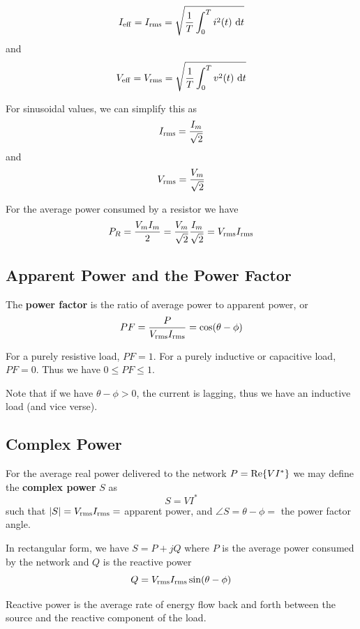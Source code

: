 \documentclass[12pt]{article}
\begin{document}
\[ I_{{\rm eff}} = I_{{\rm rms}} = \sqrt{\frac{1}{T}\int_0^T i^2(t) \ {\rm d} t} \] and \[ V_{{\rm eff}} = V_{{\rm rms}} = \sqrt{\frac{1}{T}\int_0^T v^2(t) \ {\rm d} t} \]

For sinusoidal values, we can simplify this as \[ I_{{\rm rms}} = \frac{I_m}{\sqrt{2}} \] and \[ V_{{\rm rms}} = \frac{V_m}{\sqrt{2}} \]

For the average power consumed by a resistor we have \[ P_R = \frac{V_mI_m}{2} = \frac{V_m}{\sqrt{2}}\frac{I_m}{\sqrt{2}} = V_{{\rm rms}}I_{{\rm rms}} \]

\subsection*{Apparent Power and the Power Factor}
The {\bf power factor} is the ratio of average power to apparent power, or \[ PF = \frac{P}{V_{{\rm rms}}I_{{\rm rms}}} = \cos(\theta - \phi) \]

For a purely resistive load, $PF = 1$. For a purely inductive or capacitive load, $PF = 0$. Thus we have $0 \leq PF \leq 1$.

Note that if we have $\theta - \phi > 0$, the current is lagging, thus we have an inductive load (and vice verse).

\subsection*{Complex Power}
For the average real power delivered to the network $P = {\rm Re}\{VI^*\}$ we may define the {\bf complex power} $S$ as \[ S = VI^* \] such that $|S| = V_{{\rm rms}}I_{{\rm rms}} =$ apparent power, and $\angle S = \theta - \phi =$ the power factor angle.

In rectangular form, we have $S = P + jQ$ where $P$ is the average power consumed by the network and $Q$ is the reactive power \[ Q = V_{{\rm rms}}I_{{\rm rms}}\sin(\theta - \phi) \]

Reactive power is the average rate of energy flow back and forth between the source and the reactive component of the load.
\end{document}
